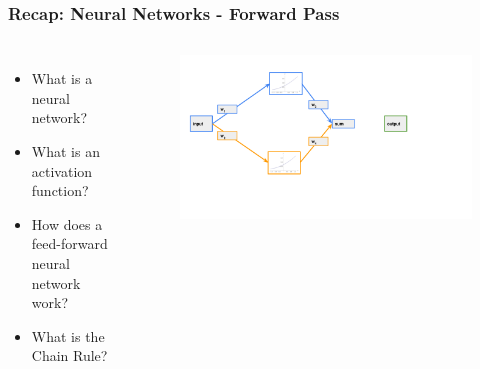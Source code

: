 \documentclass[aspectratio=169]{beamer}
\newcommand{\myblue}[1]{{\color{blue}{#1}}}
\begin{document}
\begin{frame}[fragile]\frametitle{Recap: Neural Networks - Forward Pass}
\myblue{What did we talk about last?}
\begin{columns}
        \begin{itemize}
            \item What is a neural network?
            \item What is an activation function?
            \item How does a feed-forward neural network work?
            \item What is the Chain Rule?
        \end{itemize}
        \begin{figure}
        \centering
        \includegraphics[trim={1cm 3cm 5cm 0.35cm },clip,width=\linewidth]{BP_3}
        \end{figure}
\end{columns}
\end{frame}
\end{document}
